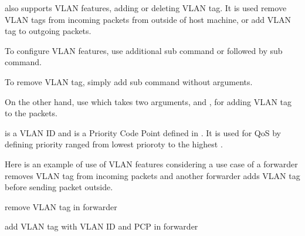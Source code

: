 \documentclass[a4paper,11pt,openany,oneside,english]{sphinxmanual}
\begin{document}
 also supports VLAN features, adding or deleting VLAN tag.
It is used remove VLAN tags from incoming packets from outside of host
machine, or add VLAN tag to outgoing packets.

To configure VLAN features, use additional sub command 
or  followed by  sub command.

To remove VLAN tag, simply add  sub command without arguments.

\begin{sphinxVerbatim}[commandchars=\\\{\},formatcom=\footnotesize]
\end{sphinxVerbatim}

On the other hand, use  which takes two arguments,
 and , for adding VLAN tag to the packets.

\begin{sphinxVerbatim}[commandchars=\\\{\},formatcom=\footnotesize]
\end{sphinxVerbatim}

 is a VLAN ID and  is a Priority Code Point defined in
.
It is used for QoS by defining priority ranged from lowest prioroty
 to the highest .

Here is an example of use of VLAN features considering a use case of
a forwarder removes VLAN tag from incoming packets and another forwarder
adds VLAN tag before sending packet outside.

\begin{sphinxVerbatim}[commandchars=\\\{\},formatcom=\footnotesize]
 remove VLAN tag in forwarder 

 add VLAN tag with VLAN ID and PCP in forwarder 
\end{sphinxVerbatim}
\end{document}
